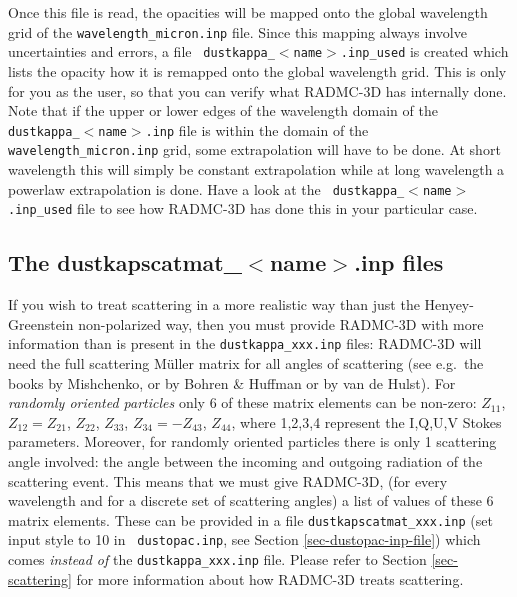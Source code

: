 \documentclass{report}
\begin{document}
Once this file is read, the opacities will be mapped onto the global
wavelength grid of the {\small\tt wavelength\_micron.inp} file. Since this mapping
always involve uncertainties and errors, a file {\small\tt
  dustkappa\_$<$name$>$.inp\_used} is created which lists the opacity how it
is remapped onto the global wavelength grid. This is only for you as the
user, so that you can verify what RADMC-3D has internally done. Note that if
the upper or lower edges of the wavelength domain of the {\small\tt
  dustkappa\_$<$name$>$.inp} file is within the domain of the {\small\tt
  wavelength\_micron.inp} grid, some extrapolation will have to be done.  At
short wavelength this will simply be constant extrapolation while at long
wavelength a powerlaw extrapolation is done. Have a look at the {\small\tt
  dustkappa\_$<$name$>$.inp\_used} file to see how RADMC-3D has done this
in your particular case.

\subsection{The dustkapscatmat\_$<$name$>$.inp files}
\label{sec-dustkapscatmat-files}
%
If you wish to treat scattering in a more realistic way than just the
Henyey-Greenstein non-polarized way, then you must provide RADMC-3D with
more information than is present in the {\small\tt dustkappa\_xxx.inp}
files: RADMC-3D will need the full scattering M\"uller matrix for all angles
of scattering (see e.g.\ the books by Mishchenko, or by Bohren \& Huffman or
by van de Hulst). For {\em randomly oriented particles} only 6 of these
matrix elements can be non-zero: $Z_{11}$, $Z_{12}=Z_{21}$, $Z_{22}$,
$Z_{33}$, $Z_{34}=-Z_{43}$, $Z_{44}$, where 1,2,3,4 represent the I,Q,U,V
Stokes parameters. Moreover, for randomly oriented particles there is only 1
scattering angle involved: the angle between the incoming and outgoing
radiation of the scattering event. This means that we must give RADMC-3D,
(for every wavelength and for a discrete set of scattering angles) a list of
values of these 6 matrix elements. These can be provided in a file
{\small\tt dustkapscatmat\_xxx.inp} (set input style to 10 in {\small\tt
  dustopac.inp}, see Section \ref{sec-dustopac-inp-file}) which comes {\em
  instead of} the {\small\tt dustkappa\_xxx.inp} file. Please refer to
Section \ref{sec-scattering} for more information about how RADMC-3D treats
scattering.
\end{document}
